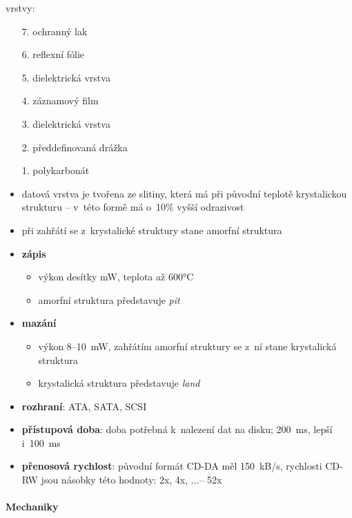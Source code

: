 \documentclass[a4paper,12pt]{article}
\providecommand{\tightlist}{%
\setlength{\itemsep}{0pt}\setlength{\parskip}{0pt}}
\begin{document}
vrstvy:
\begin{itemize}
  \tightlist
  \item[7.] ochranný lak
  \item[6.] reflexní fólie
  \item[5.] dielektrická vrstva
  \item[4.] záznamový film
  \item[3.] dielektrická vrstva
  \item[2.] předdefinovaná drážka
  \item[1.] polykarbonát
  \newline
  \item datová vrstva je tvořena ze slitiny, která má při původní teplotě
  krystalickou strukturu -- v~této formě má o~10\% vyšší odrazivost
  \item při zahřátí se z~krystalické struktury stane amorfní struktura
  \item \textbf{zápis}
  \begin{itemize}
    \tightlist
    \item výkon desítky mW, teplota až 600°C
    \item amorfní struktura představuje \emph{pit}
  \end{itemize}
  \item \textbf{mazání}
  \begin{itemize}
    \tightlist
    \item výkon 8--10~mW, zahřátím amorfní struktury se z~ní stane krystalická
    struktura
    \item krystalická struktura představuje \emph{land}
  \end{itemize}
  \item \textbf{rozhraní}: ATA, SATA, SCSI
  \item \textbf{přístupová doba}: doba potřebná k~nalezení dat na disku; 200~ms,
  lepší i~100~ms
  \item \textbf{přenosová rychlost}: původní formát CD-DA měl 150~kB/s,
  rychlosti CD-RW jsou násobky této hodnoty: 2x, 4x, ...-- 52x
\end{itemize}

\paragraph{Mechaniky}
\end{document}
